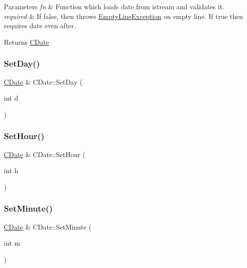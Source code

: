 \begin{DoxyParams}{Parameters}
{\em fn} & Function which loads date from istream and validates it. \\
\hline
{\em required} & If false, then throws \mbox{\hyperlink{class_empty_line_exception}{Empty\+Line\+Exception}} on empty line. If true then requires date even after. \\
\hline
\end{DoxyParams}
\begin{DoxyReturn}{Returns}
\mbox{\hyperlink{class_c_date}{C\+Date}} 
\end{DoxyReturn}
\mbox{\label{class_c_date_a35209c0b03fc6841fd08c8db4fee68a4}} 
\subsubsection{\texorpdfstring{Set\+Day()}{SetDay()}}
{\footnotesize\ttfamily \mbox{\hyperlink{class_c_date}{C\+Date}} \& C\+Date\+::\+Set\+Day (\begin{DoxyParamCaption}\item[{int}]{d }\end{DoxyParamCaption})}

\mbox{\label{class_c_date_aa77cbbbcb5bad2663adadfd351d14f87}} 
\subsubsection{\texorpdfstring{Set\+Hour()}{SetHour()}}
{\footnotesize\ttfamily \mbox{\hyperlink{class_c_date}{C\+Date}} \& C\+Date\+::\+Set\+Hour (\begin{DoxyParamCaption}\item[{int}]{h }\end{DoxyParamCaption})}

\mbox{\label{class_c_date_a1d0fd38b1c94ea47359c325c4422dc31}} 
\subsubsection{\texorpdfstring{Set\+Minute()}{SetMinute()}}
{\footnotesize\ttfamily \mbox{\hyperlink{class_c_date}{C\+Date}} \& C\+Date\+::\+Set\+Minute (\begin{DoxyParamCaption}\item[{int}]{m }\end{DoxyParamCaption})}

